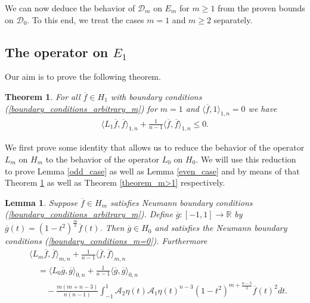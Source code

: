 \documentclass[12pt,twoside]{amsart}
\numberwithin{satz}{section}
\newtheorem{theorem}[satz]{Theorem}
\newtheorem{lemma}[satz]{Lemma}
\theoremstyle{definition}
\numberwithin{equation}{section}
\newcommand\R{\mathbb{R}}
\begin{document}
	We can now deduce the behavior of $\mathcal{D}_m$ on $E_m$ for $m\geq1$ from the proven bounds on $\mathcal{D}_0$. To this end, we treat the cases $m=1$ and $m\geq 2$ separately. 
	
	\subsection{The operator on $E_1$}\label{section_m=1}
	
	Our aim is to prove the following theorem.
	
	\begin{theorem}\label{theorem_m=1}
		For all $\overline{f}\in H_1$ with boundary conditions (\ref{boundary_conditions_arbitrary_m}) for $m=1$ and $\langle \overline{f},1\rangle_{1,n}=0$ we have
		\begin{align}\label{inner_product_ineq_m=1}
			\langle L_1\overline{f},\overline{f}\rangle_{1,n}+\frac{1}{n-1}\langle \overline{f},\overline{f}\rangle_{1,n}\leq 0.
		\end{align}
	\end{theorem}
	
	We first prove some identity that allows us to reduce the behavior of the operator $L_m$ on $H_m$ to the behavior of the operator $L_0$ on $H_0$. We will use this reduction to prove Lemma \ref{odd_case} as well as Lemma \ref{even_case} and by means of that Theorem \ref{theorem_m=1} as well as Theorem \ref{theorem_m>1} respectively.
	
	\begin{lemma}\label{lemma_orthogonal_space}
		Suppose $\overline{f} \in H_m$ satisfies Neumann boundary conditions (\ref{boundary_conditions_arbitrary_m}). Define $\overline{g}:[-1,1]\to\R$ by $\overline{g}(t)=(1-t^2)^{\frac{m}{2}}\overline{f}(t)$. Then $\overline{g}\in H_0$ and satisfies the Neumann boundary conditions (\ref{boundary_conditions_m=0}). Furthermore
		\begin{align*}
			&\langle L_m \overline{f},\overline{f}\rangle_{m,n}+\frac{1}{n-1}\langle \overline{f},\overline{f}\rangle_{m,n} \\
			& \quad = \langle L_0\overline{g},\overline{g}\rangle_{0,n} + \frac{1}{n-1}\langle \overline{g},\overline{g}\rangle_{0,n} \\
			& \quad \quad -\frac{m(m+n-3)}{n(n-1)}\int_{-1}^1 \mathcal{A}_2\eta(t)\mathcal{A}_1\eta(t)^{n-3}(1-t^2)^{m+\frac{n-5}{2}} \overline{f}(t)^2dt.
		\end{align*}
	\end{lemma}
	
\end{document}
